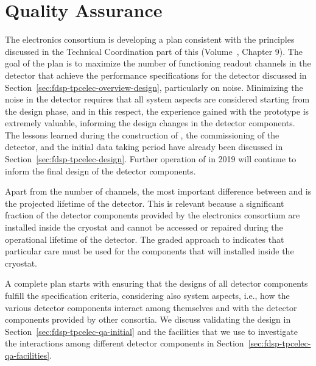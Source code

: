 \section{Quality Assurance}
\label{sec:fdsp-tpcelec-qa}

The  electronics consortium is developing a  plan consistent
with the principles discussed in the Technical Coordination part of this 
 (Volume~\volnumbertc, Chapter 9). %
The goal of the  plan is to maximize the number of functioning
readout channels in the detector that achieve the performance specifications
for the detector discussed in Section~\ref{sec:fdsp-tpcelec-overview-design},
particularly on noise. Minimizing the noise in the detector requires that all
system aspects are considered starting from the design phase, and in this
respect, the experience gained with the  prototype is extremely
valuable, informing the design changes in the detector 
components. The lessons learned during the construction of ,
the commissioning of the detector, and the initial data taking period have
already been discussed in Section~\ref{sec:fdsp-tpcelec-design}. Further
operation of  in 2019 will continue to inform the final design
of the detector components.

Apart from the number of channels, the most important difference
between  and  is the projected lifetime of the detector. This
is relevant because a significant fraction of the detector components provided 
by the  electronics consortium are installed inside the cryostat and cannot 
be accessed or repaired during the operational lifetime of the detector. The 
graded approach to  indicates that particular care must be used for
the  components that will installed inside the cryostat.

A complete  plan starts with ensuring that the designs of all
detector components fulfill the specification criteria, considering
also system aspects, i.e., how the various detector components interact
among themselves and with the detector components provided by other 
consortia. We discuss validating the design in 
Section~\ref{sec:fdsp-tpcelec-qa-initial} and the facilities that we use
to investigate the interactions among different detector components
in Section~\ref{sec:fdsp-tpcelec-qa-facilities}. 

